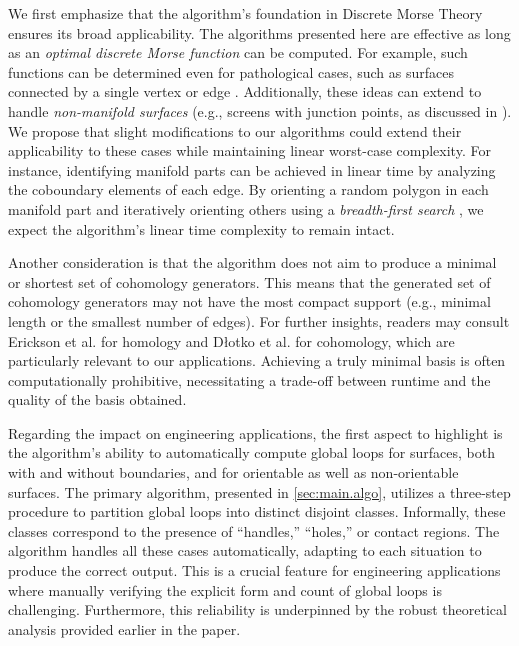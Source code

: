 \documentclass[a4paper,twoside,10pt]{article}
\theoremstyle{plain}
\theoremstyle{definition}
\theoremstyle{remark}
\begin{document}
We first emphasize that the algorithm's foundation in Discrete Morse Theory ensures its broad applicability.
The algorithms presented here are effective as long as an \emph{optimal discrete Morse function} can be computed.
For example, such functions can be determined even for pathological cases, such as surfaces connected by a single vertex or edge \cite{Lewiner2003OptimalDM}.
Additionally, these ideas can extend to handle \emph{non-manifold surfaces} (e.g., screens with junction points, as discussed in \cite{claeys2013integral,claeys2016integral}).
We propose that slight modifications to our algorithms could extend their applicability to these cases while maintaining linear worst-case complexity.
For instance, identifying manifold parts can be achieved in linear time by analyzing the coboundary elements of each edge.
By orienting a random polygon in each manifold part and iteratively orienting others using a \emph{breadth-first search} \cite{cormen2022introduction}, we expect the algorithm's linear time complexity to remain intact.

Another consideration is that the algorithm does not aim to produce a minimal or shortest set of cohomology generators.
This means that the generated set of cohomology generators may not have the most compact support (e.g., minimal length or the smallest number of edges).
For further insights, readers may consult Erickson et al. \cite{erickson2005greedy} for homology and D\l{}otko et al.
\cite{dlotko2014lazy} for cohomology, which are particularly relevant to our applications.
Achieving a truly minimal basis is often computationally prohibitive, necessitating a trade-off between runtime and the quality of the basis obtained.

Regarding the impact on engineering applications, the first aspect to highlight is the algorithm's ability to automatically compute global loops for surfaces, both with and without boundaries, and for orientable as well as non-orientable surfaces.
The primary algorithm, presented in \cref{sec:main.algo}, utilizes a three-step procedure to partition global loops into distinct disjoint classes.
Informally, these classes correspond to the presence of ``handles,'' ``holes,'' or contact regions.
The algorithm handles all these cases automatically, adapting to each situation to produce the correct output.
This is a crucial feature for engineering applications where manually verifying the explicit form and count of global loops is challenging.
Furthermore, this reliability is underpinned by the robust theoretical analysis provided earlier in the paper.
\end{document}
